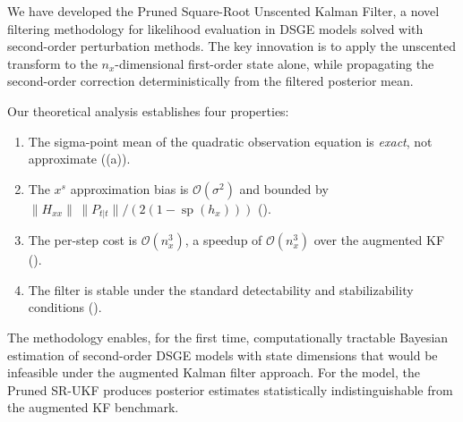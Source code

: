 \documentclass[12pt,a4paper]{article}
\newcommand{\xs}{{x^{s}}}
\newcommand{\hx}{h_x}
\newcommand{\Hxx}{H_{xx}}
\newcommand{\cO}{\mathcal{O}}
\DeclareMathOperator{\specrad}{sp}
\begin{document}
We have developed the Pruned Square-Root Unscented Kalman Filter, a
novel filtering methodology for likelihood evaluation in DSGE models
solved with second-order perturbation methods. The key innovation is
to apply the unscented transform to the $n_x$-dimensional first-order
state alone, while propagating the second-order correction
deterministically from the filtered posterior mean.

Our theoretical analysis establishes four properties:
\begin{enumerate}[nosep]
\item The sigma-point mean of the quadratic observation equation is
\emph{exact}, not approximate ((a)).
\item The $\xs$ approximation bias is $\cO(\sigma^2)$ and bounded
by $\|\Hxx\|\,\|P_{t|t}\| / (2(1 - \specrad(\hx)))$
().
\item The per-step cost is $\cO(n_x^3)$, a speedup of $\cO(n_x^3)$
over the augmented KF ().
\item The filter is stable under the standard detectability and
stabilizability conditions ().
\end{enumerate}

The methodology enables, for the first time, computationally
tractable Bayesian estimation of second-order DSGE models with
state dimensions that would be infeasible under the augmented Kalman
filter approach. For the \citet{schmitt2003closing} model, the
Pruned SR-UKF produces posterior estimates statistically
indistinguishable from the augmented KF benchmark.
\end{document}
